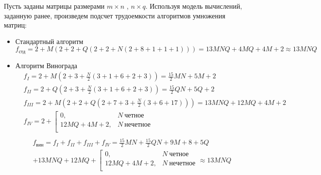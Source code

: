 \documentclass[a4paper,12pt]{report}
\begin{document}
\hspace{0.6cm}Пусть заданы матрицы размерами $m \times n$ , $n \times q$. Используя модель вычислений, заданную ранее, произведем подсчет трудоемкости алгоритмов умножения матриц:
\begin{itemize}

\item Стандартный алгоритм
\[
f_{стд} = 2 + M(2 + 2 + Q(2 + 2 + N(2 + 8 + 1 + 1 + 1))) = 13MNQ + 4MQ + 4M + 2 \approx 13MNQ 
\]

\item Алгоритм Винограда
\begin{align*}
& f_{I} = 2 + M(2 + 3 + \frac{N}{2} (3 + 1 + 6 + 2 + 3)) = \frac{15}{2} MN + 5M + 2\\
& f_{II} = 2 + Q(2 + 3 + \frac{N}{2} (3 + 1 + 6 + 2 + 3)) = \frac{15}{2} QN + 5Q + 2\\
& f_{III} = 2 + M(2 + 2 + Q(2 + 7 + 3 + \frac{N}{2}(3 + 6 + 17))) = 13MNQ + 12 MQ + 4M + 2\\
& f_{IV} = 2 + \left[
	\begin{array}{ccc}
     0, & N \ четное \\
     12MQ + 4M + 2,  & N \ нечетное \\
  \end{array}
  \right.\\
\end{align*}
\begin{multline*} 
f_{вин} = f_{I} + f_{II} + f_{III} + f_{IV} = \frac{15}{2} MN + \frac{15}{2} QN + 9M + 8 + 5Q \\ + 13MNQ + 12MQ + \left[
	\begin{array}{ccc}
     0, & N \ четное \\
     12MQ + 4M + 2,  & N \ нечетное \\
  \end{array}
  \right. \approx 13MNQ
\end{multline*}


\end{itemize}
\end{document}
